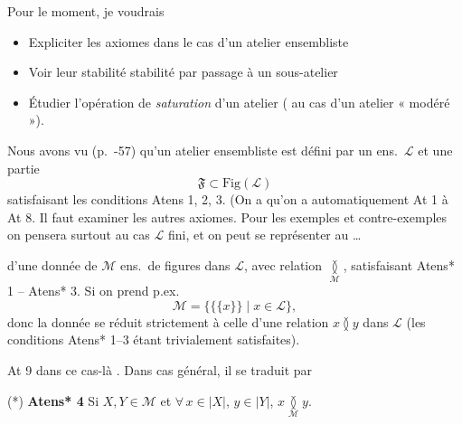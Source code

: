\documentclass[11pt,a4paper]{article}
\begin{document}

Pour le moment, je voudrais
\begin{itemize}
  \item[1°)] Expliciter les axiomes dans le cas d'un atelier ensembliste
  \item[2°)] Voir leur stabilité \ill{} \ill{} stabilité par passage à un sous-atelier
  \item[3°)] Étudier l'opération de \emph{saturation} d'un atelier (\ill{} \ill{} au cas d'un atelier « modéré »).
\end{itemize}

Nous avons vu (p.~-57) qu'un atelier ensembliste est défini par un ens.\ $\mathcal{L}$ et une partie \struck{\ill{}}
\[
  \mathfrak{F} \subset \mathrm{Fig}(\mathcal{L})
\]
satisfaisant les conditions Atens 1, 2, 3. (On a  qu'on a automatiquement At 1 à At 8. Il faut examiner les autres axiomes. Pour les exemples et contre-exemples on pensera surtout au cas $\mathcal{L}$ fini, et \ill{} on peut se représenter au  \ldots{}


\ill{} d'une donnée de $\mathcal{M}$ ens.\ de figures \ill{} dans $\mathcal{L}$, avec relation $\underset{\mathcal{M}}{\between}$, satisfaisant Atens* 1 -- Atens* 3. Si on prend p.ex.
\[
  \mathcal{M} = \lbrace \lbrace \lbrace x \rbrace \rbrace \mid x \in \mathcal{L} \rbrace ,
\]
donc la donnée se réduit strictement à celle d'une relation  $x \between y$ dans $\mathcal{L}$ (les conditions Atens* 1--3 étant trivialement satisfaites).

At 9 dans ce cas-là  . Dans  cas général, il se traduit par

\textbf{} (*) \textbf{Atens* 4} Si $X, Y \in \mathcal{M}$ et  $\forall\, x \in |X|$, $y \in |Y|$, $x \underset{\mathcal{M}}{\between} y$. \struck{\ill{}}
\end{document}
